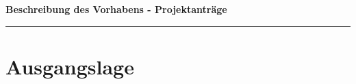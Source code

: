 \documentclass[ngerman]{scrartcl}
\newcommand{\applicants}{[Name, Vorname, Ort aller Antragstellenden]}
\newcommand{\project}{[Titel des Projekts]}
\begin{document}
\pagestyle{empty}
\setcounter{page}{1}

%

\cleardoublepage
\pagestyle{plain}


{\raggedright{} \normalsize \bfseries 
	Beschreibung des Vorhabens - Projektanträge \newline \par
	\applicants{} \newline \par
	\project{} \par
	\rule{\textwidth}{0.5pt} \par
}


\section{Ausgangslage}
\label{sec:work-report}
\end{document}
